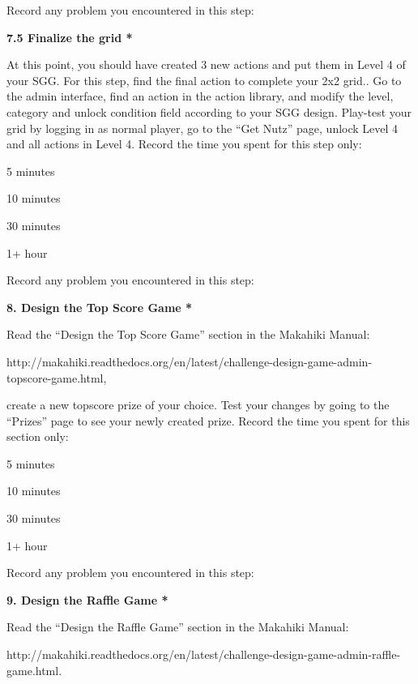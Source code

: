 Record any problem you encountered in this step: \underline{\hspace{4cm}}

{\bf 7.5 Finalize the grid *}

At this point, you should have created 3 new actions and put them in Level 4 of your SGG. For this step, find the final action to complete your 2x2 grid.. Go to the admin interface, find an action in the action library, and modify the level, category and unlock condition field according to your SGG design. Play-test your grid by logging in as normal player, go to the ``Get Nutz'' page, unlock Level 4 and all actions in Level 4. Record the time you spent for this step only:

\begin{radiobutton}
\item 5 minutes
\item  10 minutes
\item  30 minutes
\item  1+ hour
\end{radiobutton}

Record any problem you encountered in this step: \underline{\hspace{4cm}}

{\bf 8. Design the Top Score Game *}

Read the ``Design the Top Score Game'' section in the Makahiki Manual:

http://makahiki.readthedocs.org/en/latest/challenge-design-game-admin-topscore-game.html, 

create a new topscore prize of your choice. Test your changes by going to the ``Prizes'' page to see your newly created prize. Record the time you spent for this section only:

\begin{radiobutton}
\item 5 minutes
\item  10 minutes
\item  30 minutes
\item  1+ hour
\end{radiobutton}

Record any problem you encountered in this step: \underline{\hspace{4cm}}

{\bf 9. Design the Raffle Game *}

Read the ``Design the Raffle Game'' section in the Makahiki Manual:

http://makahiki.readthedocs.org/en/latest/challenge-design-game-admin-raffle-game.html. 

